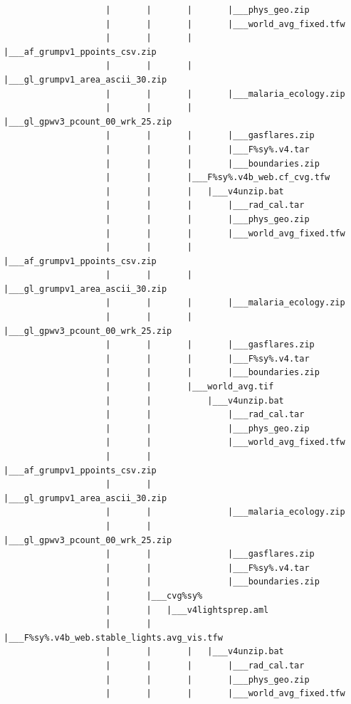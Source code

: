 \documentclass[]{book}
\begin{document}
\begin{verbatim}
                    |       |       |       |___phys_geo.zip
                    |       |       |       |___world_avg_fixed.tfw
                    |       |       |       |___af_grumpv1_ppoints_csv.zip
                    |       |       |       |___gl_grumpv1_area_ascii_30.zip
                    |       |       |       |___malaria_ecology.zip
                    |       |       |       |___gl_gpwv3_pcount_00_wrk_25.zip
                    |       |       |       |___gasflares.zip
                    |       |       |       |___F%sy%.v4.tar
                    |       |       |       |___boundaries.zip
                    |       |       |___F%sy%.v4b_web.cf_cvg.tfw
                    |       |       |   |___v4unzip.bat
                    |       |       |       |___rad_cal.tar
                    |       |       |       |___phys_geo.zip
                    |       |       |       |___world_avg_fixed.tfw
                    |       |       |       |___af_grumpv1_ppoints_csv.zip
                    |       |       |       |___gl_grumpv1_area_ascii_30.zip
                    |       |       |       |___malaria_ecology.zip
                    |       |       |       |___gl_gpwv3_pcount_00_wrk_25.zip
                    |       |       |       |___gasflares.zip
                    |       |       |       |___F%sy%.v4.tar
                    |       |       |       |___boundaries.zip
                    |       |       |___world_avg.tif
                    |       |           |___v4unzip.bat
                    |       |               |___rad_cal.tar
                    |       |               |___phys_geo.zip
                    |       |               |___world_avg_fixed.tfw
                    |       |               |___af_grumpv1_ppoints_csv.zip
                    |       |               |___gl_grumpv1_area_ascii_30.zip
                    |       |               |___malaria_ecology.zip
                    |       |               |___gl_gpwv3_pcount_00_wrk_25.zip
                    |       |               |___gasflares.zip
                    |       |               |___F%sy%.v4.tar
                    |       |               |___boundaries.zip
                    |       |___cvg%sy%
                    |       |   |___v4lightsprep.aml
                    |       |       |___F%sy%.v4b_web.stable_lights.avg_vis.tfw
                    |       |       |   |___v4unzip.bat
                    |       |       |       |___rad_cal.tar
                    |       |       |       |___phys_geo.zip
                    |       |       |       |___world_avg_fixed.tfw

\end{verbatim}
\end{document}
